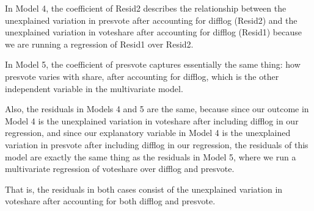 \documentclass[12pt,letterpaper]{article}
\begin{document}
\begin{enumerate}
		In Model 4, the coefficient of Resid2 describes the relationship between the unexplained variation in presvote after accounting for difflog (Resid2) and the unexplained variation in voteshare after accounting for difflog (Resid1) because we are running a regression of Resid1 over Resid2. 
	
		In Model 5, the coefficient of presvote captures essentially the same thing: how presvote varies with share, after accounting for difflog, which is the other independent variable in the multivariate model. 
		
		Also, the residuals in Models 4 and 5 are the same, because since our outcome in Model 4 is the unexplained variation in voteshare after including difflog in our regression, and since our explanatory variable in Model 4 is the unexplained variation in presvote after including difflog in our regression, the residuals of this model are exactly the same thing as the residuals in Model 5, where we run a multivariate regression of voteshare over difflog and presvote. 
	
		That is, the residuals in both cases consist of the unexplained variation in voteshare after accounting for both difflog and presvote. 
		
	\end{enumerate}
\end{document}
